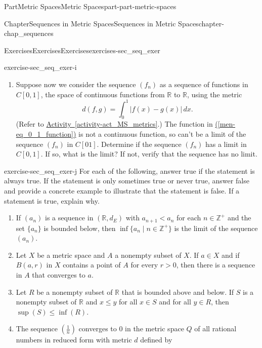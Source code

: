 \documentclass[oneside,10pt,]{book}
\newcommand{\xreffont}{\relax}
\numberwithin{equation}{chapter}
\newcommand{\Z}{\mathbb{Z}}
\newcommand{\R}{\mathbb{R}}
\newcommand{\lt}{<}
\newcommand{\gt}{>}
\newcommand{\amp}{&}
\begin{document}
\begin{partptx}{Part}{Metric Spaces}{}{Metric Spaces}{}{}{part-part-metric-spaces}
\begin{chapterptx}{Chapter}{Sequences in Metric Spaces}{}{Sequences in Metric Spaces}{}{}{chapter-chap_sequences}
\begin{exercises-section}{Exercises}{Exercises}{}{Exercises}{}{}{exercises-sec_seq_exer}
\begin{divisionexercise}{9}{}{}{exercise-sec_seq_exer-i}
\begin{enumerate}[font=\bfseries,label=(\alph*),ref=\alph*]
\begin{equation}
f(x) = \begin{cases} 0 \amp \text{ if }  x \neq 1 \\ 1 \amp \text{ if }  x=1. \end{cases}\label{men-eq_0_1_function}
\end{equation}
Determine if the sequence \((f_n)\) converges to \((f)\) in the metric space \((X,d)\).%
\item{}Suppose now we consider the sequence \((f_n)\) as a sequence of functions in \(C[0,1]\), the space of continuous functions from \(\R\) to \(\R\), using the metric%
\begin{equation*}
d(f,g) = \int_0^1 |f(x) - g(x)| \,dx\text{.}
\end{equation*}
(Refer to \hyperref[activity-act_MS_metrics]{Activity~{\xreffont\ref{activity-act_MS_metrics}}}.) The function in \hyperref[men-eq_0_1_function]{({\xreffont\ref{men-eq_0_1_function}})} is not a continuous function, so can't be a limit of the sequence \((f_n)\) in \(C[01]\). Determine if the sequence \((f_n)\) has a limit in \(C[0,1]\). If so, what is the limit? If not, verify that the sequence has no limit.%
\end{enumerate}%
\end{divisionexercise}%
\begin{divisionexercise}{10}{}{}{exercise-sec_seq_exer-j}%
For each of the following, answer true if the statement is always true. If the statement is only sometimes true or never true, answer false and provide a concrete example to illustrate that the statement is false. If a statement is true, explain why.%
\begin{enumerate}[font=\bfseries,label=(\alph*),ref=\alph*]%
\item{}If \((a_n)\) is a sequence in \((\R, d_E)\) with \(a_{n+1} \lt a_n\) for each \(n \in \Z^+\) and the set \(\{a_n\}\) is bounded below, then \(\inf \{a_n \mid n \in \Z^+\}\) is the limit of the sequence \((a_n)\).%
\item{}Let \(X\) be a metric space and \(A\) a nonempty subset of \(X\). If \(a \in X\) and if \(B(a,r)\) in \(X\) contains a point of \(A\) for every \(r \gt 0\), then there is a sequence in \(A\) that converges to \(a\).%
\item{}Let \(R\) be a nonempty subset of \(\R\) that is bounded above and below. If \(S\) is a nonempty subset of \(\R\) and \(x \leq y\) for all \(x \in S\) and for all \(y \in R\), then \(\sup(S) \leq \inf(R)\).%
\item{}The sequence \(\left(\frac{1}{n}\right)\) converges to \(0\) in the metric space \(Q\) of all rational numbers in reduced form with metric \(d\) defined by%

\end{enumerate}
\end{divisionexercise}
\end{exercises-section}
\end{chapterptx}
\end{partptx}
\end{document}
